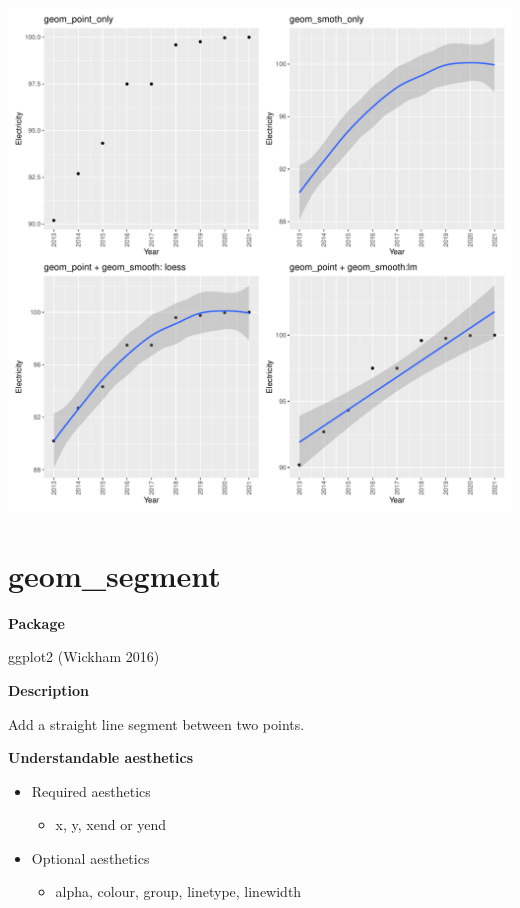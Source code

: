 \documentclass[
  letterpaper,
  DIV=11,
  numbers=noendperiod]{scrreprt}
\providecommand{\tightlist}{%
  \setlength{\itemsep}{0pt}\setlength{\parskip}{0pt}}\usepackage{longtable,booktabs,array}
\begin{document}
\includegraphics{s_files/figure-pdf/unnamed-chunk-3-1.pdf}

\section{geom\_segment}\label{geom_segment}

\textbf{Package}

ggplot2 (Wickham 2016)

\textbf{Description}

Add a straight line segment between two points.

\textbf{Understandable aesthetics}

\begin{itemize}
\tightlist
\item
  Required aesthetics

  \begin{itemize}
  \tightlist
  \item
    x, y, xend or yend
  \end{itemize}
\item
  Optional aesthetics

  \begin{itemize}
  \tightlist
  \item
    alpha, colour, group, linetype, linewidth
  \end{itemize}
\end{itemize}
\end{document}
